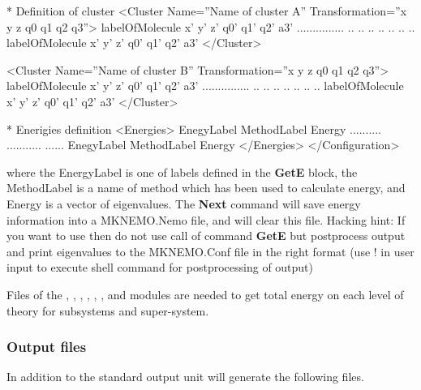 \begin{filelist}
\begin{sourcelisting}
  * Definition of cluster
  <Cluster Name=''Name of cluster A'' Transformation=''x y z q0 q1 q2 q3''>
    labelOfMolecule x' y' z'  q0' q1' q2' a3'
    ............... .. .. ..  ..  ..  ..  ..
    labelOfMolecule x' y' z'  q0' q1' q2' a3'
  </Cluster>

  <Cluster Name=''Name of cluster B'' Transformation=''x y z q0 q1 q2 q3''>
    labelOfMolecule x' y' z'  q0' q1' q2' a3'
    ............... .. .. ..  ..  ..  ..  ..
    labelOfMolecule x' y' z'  q0' q1' q2' a3'
  </Cluster>


  * Enerigies definition
  <Energies>
    EnegyLabel MethodLabel Energy
    .......... ........... ......
    EnegyLabel MethodLabel Energy
  </Energies>
</Configuration>
\end{sourcelisting}
where the EnergyLabel is one of labels defined in the {\bf GetE} block, the MethodLabel is a name of method which has been used to calculate energy, and Energy is a vector of eigenvalues. The {\bf Next} command will save energy information into a MKNEMO.Nemo file, and will clear this file. Hacking hint: If you want to use  then do not use call of command {\bf GetE} but postprocess output and print eigenvalues to the MKNEMO.Conf file in the right format (use ! in user input to execute shell command for postprocessing of output)
\end{filelist}


Files of the , , , , , , and  modules are needed to get total energy on each level of theory for subsystems and super-system.



\subsubsection{Output files}
In addition to the standard output unit  will generate the following files.

